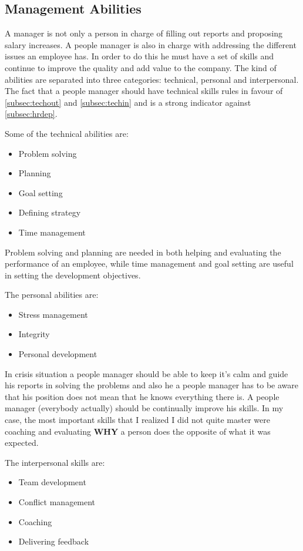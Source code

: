 \subsection{Management Abilities}
A manager is not only a person in charge of filling out reports and proposing salary increases. A people manager is also in charge with addressing the different issues an employee has. In order to do this he must have a set of skills and continue to improve the quality and add value to the company. The kind of abilities are separated into three categories: technical, personal and interpersonal. The fact that a people manager should have technical skills rules in favour of \cref{subsec:techout} and \cref{subsec:techin} and is a strong indicator against \cref{subsec:hrdep}.

Some of the technical abilities are:
\begin{itemize}
\item Problem solving
\item Planning
\item Goal setting
\item Defining strategy
\item Time management
\end{itemize}

Problem solving and planning are needed in both helping and evaluating the performance of an employee, while time management and goal setting are useful in setting the development objectives.

The personal abilities are:
\begin{itemize}
\item Stress management
\item Integrity
\item Personal development
\end{itemize}

In crisis situation a people manager should be able to keep it's calm and guide his reports in solving the problems and also he a people manager has to be aware that his position does not mean that he knows everything there is. A people manager (everybody actually) should be continually improve his skills. In my case, the most important skills that I realized I did not quite master were coaching and evaluating \textbf{WHY} a person does the opposite of what it was expected.

The interpersonal skills are:
\begin{itemize}
\item Team development
\item Conflict management 
\item Coaching
\item Delivering feedback
\end{itemize}

